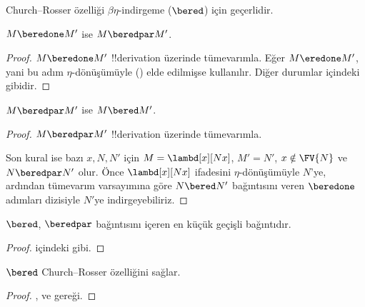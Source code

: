 \documentclass[../../../include/open-logic-section]{subfiles}
\begin{document}


Church--Rosser özelliği $\beta\eta$-indirgeme ($\bered$) için geçerlidir.

\begin{lem}
  $M \beredone M'$ ise $M \beredpar M'$.
\end{lem}

\begin{proof}
  $M \beredone M'$ !!{derivation} üzerinde tümevarımla. Eğer
  $M \eredone M'$, yani bu adım $\eta$-dönüşümüyle
  () elde edilmişse
   kullanılır. Diğer durumlar
   içindeki gibidir.
\end{proof}


\begin{lem}
  $M \beredpar M'$ ise $M \bered M'$.
\end{lem}

\begin{proof} $M \beredpar M'$ !!{derivation} üzerinde tümevarımla.

  Son kural  ise bazı $x,N,N'$ için
  $M=\lambd[x][Nx]$, $M'=N'$, $x\notin\FV{N}$ ve $N\beredpar N'$ olur.
  Önce $\lambd[x][Nx]$ ifadesini $\eta$-dönüşümüyle $N$'ye, ardından
  tümevarım varsayımına göre $N\bered N'$ bağıntısını veren $\beredone$
  adımları dizisiyle $N'$ye indirgeyebiliriz.
\end{proof}


\begin{lem}
  $\bered$, $\beredpar$ bağıntısını içeren en küçük geçişli bağıntıdır.
\end{lem}

\begin{proof}
   içindeki gibi.
\end{proof}

\begin{thm}
  $\bered$ Church--Rosser özelliğini sağlar.
\end{thm}

\begin{proof}
  ,  ve  gereği.
\end{proof}
\end{document}
